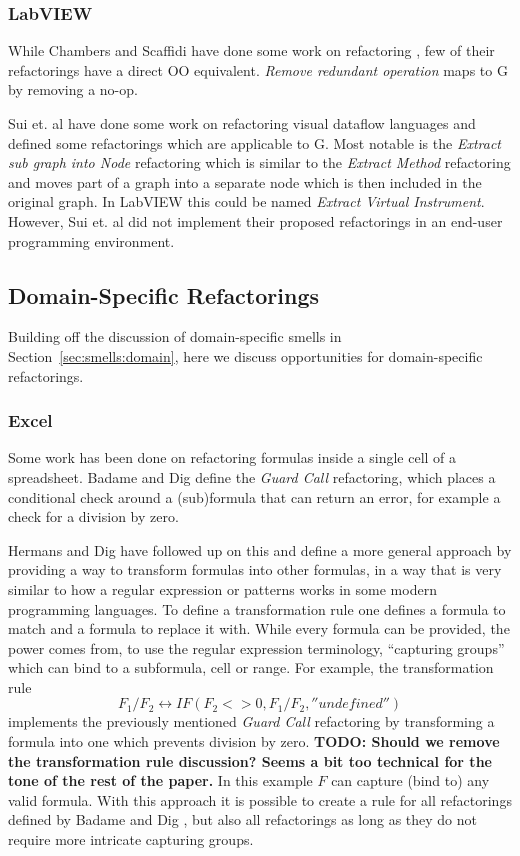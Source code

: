 \documentclass[10pt,conference,compsocconf]{IEEEtran}
\newcommand{\todo}[1]{\textbf{TODO: #1}}
\begin{document}
\subsubsection{LabVIEW}

While Chambers and Scaffidi have done some work on refactoring \cite{chambers2015impact}, few of their refactorings have a direct OO equivalent. \emph{Remove redundant operation} maps to G by removing a no-op.

Sui et. al \cite{sui2008automated} have done some work on refactoring visual dataflow languages and defined some refactorings which are applicable to G.
Most notable is the \textit{Extract sub graph into Node} refactoring which is similar to the \textit{Extract Method} refactoring and moves part of a graph into a separate node which is then included in the original graph.
In LabVIEW this could be named \textit{Extract Virtual Instrument}.
However, Sui et. al did not implement their proposed refactorings in an end-user programming environment.

\subsection{Domain-Specific Refactorings}

Building off the discussion of domain-specific smells in Section~\ref{sec:smells:domain}, here we discuss opportunities for domain-specific refactorings. 

\subsubsection{Excel}

Some work has been done on refactoring formulas inside a single cell of a spreadsheet. Badame and Dig \cite{badame2012refactoring} define the \textit{Guard Call} refactoring, which places a conditional check around a (sub)formula that can return an error, for example a check for a division by zero.

Hermans and Dig \cite{hermans2014bumblebee} have followed up on this and define a more general approach by providing a way to transform formulas into other formulas, in a way that is very similar to how a regular expression or patterns works in some modern programming languages.
To define a transformation rule one defines a formula to match and a formula to replace it with. While every formula can be provided, the power comes from, to use the regular expression terminology, ``capturing groups'' which can bind to a subformula, cell or range. For example, the transformation rule
\[F_1/F_2 \leftrightarrow IF(F_2<>0,F_1/F_2,''undefined'')\]
 implements the previously mentioned \textit{Guard Call} \cite{badame2012refactoring} refactoring by transforming a formula into one which prevents division by zero.
 \todo{Should we remove the transformation rule discussion? Seems a bit too technical for the tone of the rest of the paper.}
 In this example $F$ can capture (bind to) any valid formula.
 With this approach it is possible to create a rule for all refactorings defined by Badame and Dig \cite{badame2012refactoring}, but also all refactorings as long as they do not require more intricate capturing groups.
\end{document}
